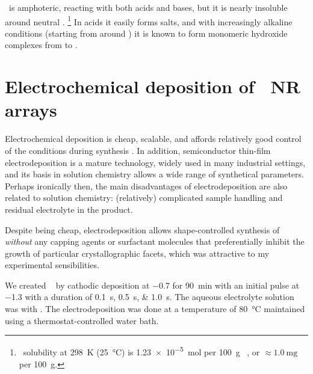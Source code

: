 \documentclass[webedition,openright,titles,swedish,english]{LuaUUThesis}\usepackage[]{graphicx}\usepackage[]{xcolor}
\begin{document}
\ZnO\ is amphoteric, reacting with both acids and bases, but it is nearly insoluble
around neutral \pH.%
\footnote{%
   \ZnO\ solubility at \qty{298}{\kelvin} (\qty{25}{\celsius}) is
   \qty{1.23e-5}{\mol} per \qty{100}{\gram} \water\ \cite{Ellis1984},
   or ${\approx}\qty{1.0}{\mg}$ per \qty{100}{\gram}.}
In acids it easily forms salts,
and with increasingly alkaline conditions (starting from around )
it is known to form monomeric hydroxide complexes from  to 
\cite{Greenwood1997,Ekberg2016}.




\section[Electrodeposition of ZnO NR arrays]{\texorpdfstring{Electrochemical deposition of \ZnO\ NR arrays}{Electrochemical deposition of ZnO NR arrays}}
\label{synthesis:electrodeposition}

Electrochemical deposition is cheap, scalable, and affords
relatively good control of the conditions during synthesis \cite{Schwarzacher2006}.
In addition, semiconductor thin-film electrodeposition is a mature technology,
widely used in many industrial settings, and its basis in solution chemistry
allows a wide range of synthetical parameters.
Perhaps ironically then, the main disadvantages of electrodeposition
are also related to solution chemistry: (relatively) complicated sample handling and residual
electrolyte in the product.

Despite being cheap, electrodeposition allows
shape-controlled synthesis of \ZnO\  \emph{without}
any capping agents or surfactant molecules that preferentially inhibit the
growth of particular crystallographic facets, which was attractive to my
experimental sensibilities.

We created \ZnO\  by cathodic deposition at \qty{-0.7}{\voltSCE}
for \qty{90}{\minute} with an initial pulse at \qty{-1.3}{\voltSCE} with a duration
of \qtylist[list-final-separator={ or }]{0.1;0.5;1.0}{\second}.
The aqueous electrolyte solution was
with .
The electrodeposition was done at a temperature of \qty{80}{\celsius} maintained
using a thermostat-controlled water bath.
\end{document}
